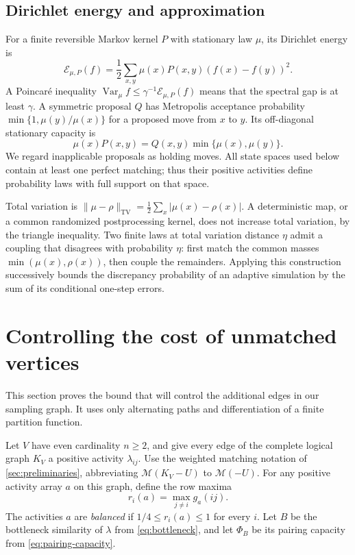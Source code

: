 \documentclass[11pt]{article}
\theoremstyle{definition}
\theoremstyle{remark}
\DeclareMathOperator{\Var}{Var}
\DeclareMathOperator{\TV}{TV}
\newcommand{\calM}{\mathcal M}
\newcommand{\calE}{\mathcal E}
\numberwithin{equation}{section}
\begin{document}
\subsection{Dirichlet energy and approximation}
For a finite reversible Markov kernel $P$ with stationary law $\mu$,
its Dirichlet energy is
\begin{equation}\label{eq:dirichlet}
 \calE_{\mu,P}(f)
 =\frac12\sum_{x,y}\mu(x)P(x,y)(f(x)-f(y))^2.
\end{equation}
A Poincar\'e inequality $\Var_\mu f\le\gamma^{-1}\calE_{\mu,P}(f)$
means that the spectral gap is at least $\gamma$. A symmetric proposal
$Q$ has Metropolis acceptance probability~\cite{MetropolisEtAl1953,Hastings1970} $\min\{1,\mu(y)/\mu(x)\}$
for a proposed move from $x$ to $y$. Its off-diagonal stationary capacity is
\begin{equation}\label{eq:metropolis-capacity}
 \mu(x)P(x,y)=Q(x,y)\min\{\mu(x),\mu(y)\}.
\end{equation}
We regard inapplicable proposals as holding moves. All state spaces
used below contain at least one perfect matching; thus their positive
activities define probability laws with full support on that space.

Total variation is
$\|\mu-\rho\|_{\TV}=\frac12\sum_x|\mu(x)-\rho(x)|$.
A deterministic map, or a common randomized postprocessing kernel,
does not increase total variation, by the triangle inequality.
Two finite laws at total variation distance $\eta$ admit a coupling
that disagrees with probability $\eta$: first match the common masses
$\min(\mu(x),\rho(x))$, then couple the remainders. Applying this
construction successively bounds the discrepancy probability of an
adaptive simulation by the sum of its conditional one-step errors.
\section{Controlling the cost of unmatched vertices}
\label{sec:holes}

This section proves the bound that will control the additional edges in
our sampling graph.  It uses only alternating paths and differentiation
of a finite partition function.

Let $V$ have even cardinality $n\ge2$, and give every edge of the complete
logical graph $K_V$ a positive activity $\lambda_{ij}$. Use the weighted
matching notation of \cref{sec:preliminaries}, abbreviating
$\calM(K_V-U)$ to $\mathcal M(-U)$. For any positive activity array $a$
on this graph, define the row maxima
\[
 r_i(a)=\max_{j\ne i}g_a(ij).
\]
The activities $a$ are \emph{balanced} if $1/4\le r_i(a)\le1$ for
every $i$. Let $B$ be the bottleneck similarity of $\lambda$ from
\eqref{eq:bottleneck}, and let $\Phi_B$ be its pairing capacity from
\eqref{eq:pairing-capacity}.
\end{document}
